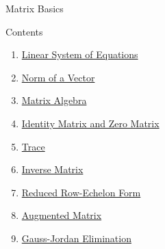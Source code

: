 \documentclass{beamer}
\begin{document}
\begin{section}{Matrix Basics}

\begin{frame}{Contents}
    \begin{enumerate}
        \item \hyperlink{1}{Linear System of Equations}
        \item \hyperlink{2}{Norm of a Vector}
        \item \hyperlink{3}{Matrix Algebra}
        \item \hyperlink{4}{Identity Matrix and Zero Matrix}
        \item \hyperlink{5}{Trace}
        \item  \hyperlink{7}{Inverse Matrix}
        \item \hyperlink{6}{Reduced Row-Echelon Form}
        \item \hyperlink{10}{Augmented Matrix}
        \item \hyperlink{9}{Gauss-Jordan Elimination}
    \end{enumerate}
       
\end{frame}


\end{section}
\end{document}
